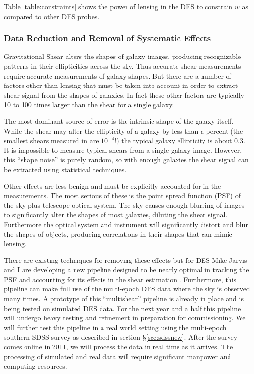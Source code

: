 \documentclass[12pt]{article}
\begin{document}
Table \ref{table:constraints} shows the power of lensing in the DES to
constrain $w$ as compared to other DES probes.

\subsubsection{Data Reduction and Removal of Systematic Effects} 
\label{sec:des:process}

Gravitational Shear alters the shapes of galaxy images, producing recognizable
patterns in their ellipticities across the sky. Thus accurate shear
measurements require accurate measurements of galaxy shapes.  But there are a
number of factors other than lensing that must be taken into account in order
to extract shear signal from the shapes of galaxies. In fact these other
factors are typically 10 to 100 times larger than the shear for a single
galaxy.

The most dominant source of error is the intrinsic shape of the galaxy itself.
While the shear may alter the ellipticity of a galaxy by less than a percent
(the smallest shears measured in \cite{SheldonLensing07} are $10^{-4}$!) the
typical galaxy ellipticity is about 0.3.  It is impossible to measure typical
shears from a single galaxy image.  However, this ``shape noise'' is purely
random, so with enough galaxies the shear signal can be extracted using
statistical techniques.

Other effects are less benign and must be explicitly accounted for in the
measurements.  The most serious of these is the point spread function (PSF) of
the sky plus telescope optical system. The sky causes enough blurring of images
to significantly alter the shapes of most galaxies, diluting the shear signal.
Furthermore the optical system and instrument will significantly distort and
blur the shapes of objects, producing correlations in their shapes that can
mimic lensing.

There are existing techniques for removing these effects but for DES Mike
Jarvis and I are developing a new pipeline designed to be nearly optimal in
tracking the PSF and accounting for its effects in the shear estimation
\cite{Bern02,JarvisJain04}.  Furthermore, this pipeline can make full use of
the multi-epoch DES data where the sky is observed many times.  A prototype of
this ``multishear'' pipeline is already in place and is being tested on
simulated DES data.  For the next year and a half this pipeline will undergo
heavy testing and refinement in preparation for commissioning.  We will further
test this pipeline in a real world setting using the multi-epoch southern SDSS
survey as described in section \S \ref{sec:sdssnew}.  After the survey comes
online in 2011, we will process the data in real time as it arrives.  The
processing of simulated and real data will require significant manpower and
computing resources.
\end{document}
